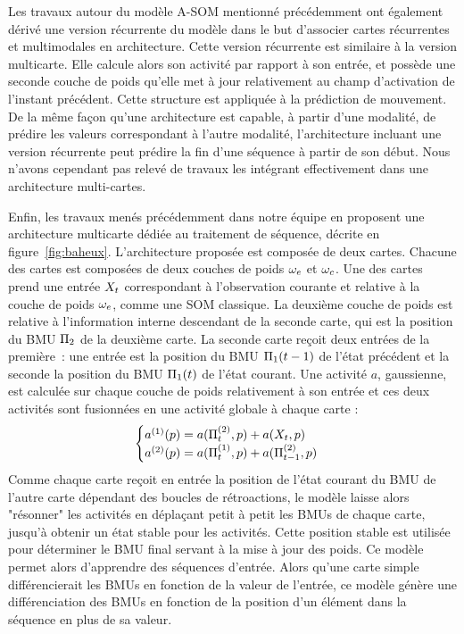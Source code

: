 \documentclass[../main]{subfiles}
\begin{document}
Les travaux autour du modèle A-SOM mentionné précédemment ont également dérivé une version récurrente du modèle \cite{Buonamente2015DiscriminatingAS} dans le but d'associer cartes récurrentes et multimodales en architecture.
Cette version récurrente est similaire à la version multicarte. Elle calcule alors son activité par rapport à son entrée, et possède une seconde couche de poids qu'elle met à jour relativement au champ d'activation de l'instant précédent.
Cette structure est appliquée à la prédiction de mouvement. De la même façon qu'une architecture est capable, à partir d'une modalité, de prédire les valeurs correspondant à l'autre modalité, l'architecture incluant une version récurrente peut prédire la fin d'une séquence à partir de son début.
Nous n'avons cependant pas relevé de travaux les intégrant effectivement dans une architecture multi-cartes.

Enfin, les travaux menés précédemment dans notre équipe en \cite{baheux_towards_2014} proposent une architecture multicarte dédiée au traitement de séquence, décrite en figure~\ref{fig:baheux}.
L'architecture proposée est composée de deux cartes. Chacune des cartes est composées de deux couches de poids $\omega_e$ et $\omega_c$. Une des cartes prend une entrée $X_t$ correspondant à l'observation courante et relative à la couche de poids $\omega_e$, comme une SOM classique. 
La deuxième couche de poids est relative à l'information interne descendant de la seconde carte, qui est la position du BMU $\Pi_2$ de la deuxième carte. 
La seconde carte reçoit deux entrées de la première~: une entrée est la position du BMU $\Pi_1(t-1)$ de l'état précédent et la seconde la position du BMU $\Pi_1(t)$ de l'état courant. 
Une activité $a$, gaussienne, est calculée sur chaque couche de poids relativement à son entrée et ces deux activités sont fusionnées en une activité globale à chaque carte :
$$
\begin{cases}
    a^{({1})}(p) = a(\Pi^{({2})}_t,p) + a(X_t,p)\\
    a^{({2})}(p) = a(\Pi^{({1})}_t,p) + a(\Pi^{({2})}_{t-1},p)
\end{cases} 
$$
Comme chaque carte reçoit en entrée la position de l'état courant du BMU de l'autre carte dépendant des boucles de rétroactions, le modèle laisse alors "résonner" les activités en déplaçant petit à petit les BMUs de chaque carte, jusqu'à obtenir un état stable pour les activités. Cette position stable est utilisée pour déterminer le BMU final servant à la mise à jour des poids.
Ce modèle permet alors d'apprendre des séquences d'entrée. Alors qu'une carte simple différencierait les BMUs en fonction de la valeur de l'entrée, ce modèle génère une différenciation des BMUs en fonction de la position d'un élément dans la séquence en plus de sa valeur. 
\end{document}
